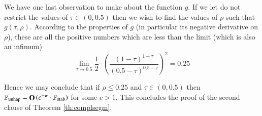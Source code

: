 \documentclass[11pt]{article}
\theoremstyle{plain}
\numberwithin{equation}{subsection}
\newcommand{\bigo}[1]{\mathop{\bf O}\/\left({#1}\right)}
\newcommand{\Punhap}{\mathbb{P}_{\textrm{unhap}}}
\newcommand{\Pstab}{\mathbb{P}_{\textrm{stab}}}
\begin{document}
We have one last observation to make about the function $g$.
If we let do not restrict the values of $\tau\in (0,0.5)$ then we wish to
find the values of $\rho$ such that $g(\tau, \rho)$. According to the properties of
$g$ (in particular its negative derivative on $\rho$), 
these are all the positive numbers which are less than the limit 
(which is also an infimum)
\[
\lim_{\tau\to 0.5} \frac{1}{2} \cdot \left(
\frac{(1-\tau)^{1-\tau}}{(0.5-\tau)^{0.5-\tau}}
\right)^{2} = 0.25
\]

Hence 
we may conclude that
if $\rho\leq 0.25$
and $\tau \in (0, 0.5)$ 
then $\Punhap =\bigo{c^{-w}\cdot\Pstab}$
for some $c>1$.
This concludes the proof of the second clause 
of Theorem \ref{th:complsegm}.
 




\newpage
\end{document}

